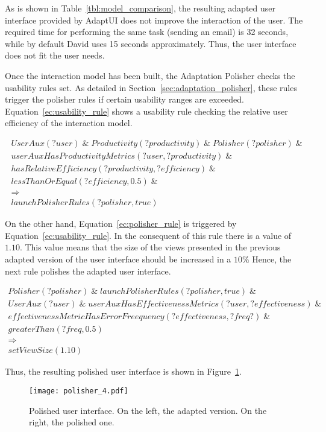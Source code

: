As is shown in Table~\ref{tbl:model_comparison}, the resulting adapted user 
interface provided by AdaptUI does not improve the interaction of the user.
The required time for performing the same task (sending an email) is 32 seconds,
while by default David uses 15 seconds approximately. Thus, the user interface
does not fit the user needs. 

Once the interaction model has been built, the Adaptation Polisher checks the
usability rules set. As detailed in Section~\ref{sec:adaptation_polisher}, these
rules trigger the polisher rules if certain usability ranges are exceeded.
Equation~\ref{ec:usability_rule} shows a usability rule checking the relative
user efficiency of the interaction model.

\footnotesize
\begin{equation} \label{ec:usability_rule}
  \begin{align*} 
  UserAux(?user)\; \&\; Productivity(?productivity)\; \&\;Polisher(?polisher)\; \&\\ 
  userAuxHasProductivityMetrics(?user, ?productivity)\; \&\;\\
  hasRelativeEfficiency(?productivity, ?efficiency)\; \&\;\\
  lessThanOrEqual(?efficiency, 0.5)\; \&\;\\
  \Rightarrow \\
  launchPolisherRules(?polisher, true)
  \end{align*}
\end{equation}
\normalsize

On the other hand, Equation~\ref{ec:polisher_rule} is triggered by 
Equation~\ref{ec:usability_rule}. In the consequent of this rule there is 
a value of $1.10$. This value means that the size of the views presented in the
previous adapted version of the user interface should be increased in a $10\%$
Hence, the next rule polishes the adapted user
interface.

\footnotesize
\begin{equation} \label{ec:polisher_rule}
  \begin{align*} 
  Polisher(?polisher)\; \&\;launchPolisherRules(?polisher, true)\; \&\\
  UserAux(?user)\; \&\;userAuxHasEffectivenessMetrics(?user, ?effectiveness)\; \&\;\\
  effectivenessMetricHasErrorFreequency(?effectiveness, ?freq?)\; \&\\
  greaterThan(?freq, 0.5)\\
  \Rightarrow \\
  setViewSize(1.10)
  \end{align*}
\end{equation}
\normalsize

Thus, the resulting polished user interface is shown in Figure~\ref{fig:polisher_4}.

\begin{figure}
\centering
\texttt{[image: polisher\_4.pdf]}
\caption{Polished user interface. On the left, the adapted version. On the 
right, the polished one.}
\label{fig:polisher_4}
\end{figure}